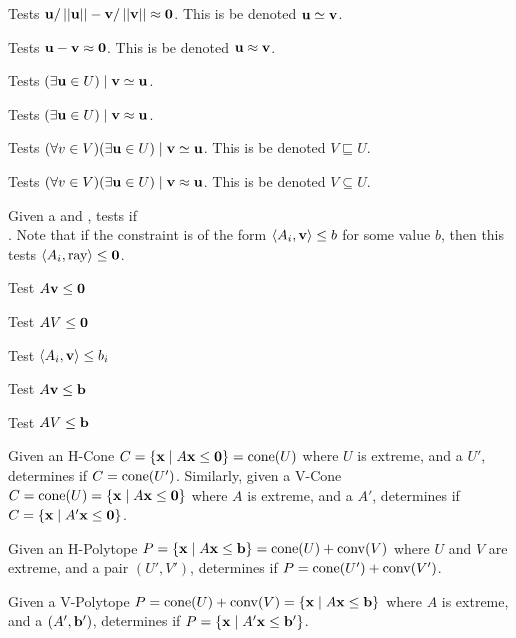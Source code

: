 Tests $\u/\norm{\u} - \v/\norm{\v} \approx \0 $.  This is be denoted $\u \simeq \v$.
\lstisequivalent

Tests $\u - \v \approx \0$.  This is be denoted $\u \approx \v$.
\lstisequal

Tests $(\exists \u \in U) \st \v \simeq \u$.
\lsthasequivalentmember

Tests $(\exists \u \in U) \st \v \approx \u$.
\lsthasequalmember

Tests $(\forall v \in V)(\exists \u \in U) \st \v \simeq \u$.  This is be denoted $V \sqsubseteq U$.
\lstsubsetmodeq

Tests $(\forall v \in V)(\exists \u \in U) \st \v \approx \u$.  This is be denoted $V \subseteq U$.
\lstsubset

Given a  and , tests if \\
.  Note that if the constraint is of the form $\ip{A_i}{\v} \leq b$ for some value $b$, then this tests $\ip{A_i}{\mli{ray}}\leq\0$.
\lstraysatisfieda

Test $A\v \leq \0$
\lstraysatisfiedb

Test $AV \leq \0$
\lstrayssatisfied

Test $\ip{A_i}{\v} \leq b_i$
\lstvecsatisfieda

Test $A\v \leq \b$
\lstvecsatisfiedb

Test $AV \leq \b$
\lstvecssatisfied

Given an H-Cone $C = \HC{A} = \cone(U)$ where $U$ is extreme, and a  $U'$, determines if $C = \cone(U')$.
Similarly, given a V-Cone $C = \cone(U) = \HC{A}$ where $A$ is extreme, and a  $A'$, determines if $C = \HC{A'}$.
\lstequivalentconerep

Given an H-Polytope $P = \HP{A}{\b} = \VP{U}{V}$ where $U$ and $V$ are extreme, and a pair $(U',V')$, determines if $P = \VP{U'}{V'}$.
\lstequivalenthpolyrep

Given a V-Polytope $P = \VP{U}{V} = \HP{A}{\b}$ where $A$ is extreme, and a  $(A',\b')$, determines if $P = \HP{A'}{\b'}$.
\lstequivalentvpolyrep



